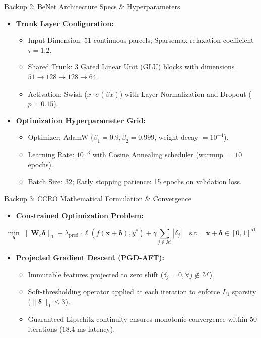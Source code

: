 \documentclass{beamer}
\begin{document}
\begin{frame}{Backup 2: BeNet Architecture Specs \& Hyperparameters}
  \begin{itemize}\setlength{\itemsep}{6pt}\small
    \item \textbf{Trunk Layer Configuration:}
    \begin{itemize}\setlength{\itemsep}{2pt}\footnotesize
      \item Input Dimension: 51 continuous parcels; Sparsemax relaxation coefficient $\tau = 1.2$.
      \item Shared Trunk: 3 Gated Linear Unit (GLU) blocks with dimensions $51 \to 128 \to 128 \to 64$.
      \item Activation: Swish ($x \cdot \sigma(\beta x)$) with Layer Normalization and Dropout ($p = 0.15$).
    \end{itemize}
    \item \textbf{Optimization Hyperparameter Grid:}
    \begin{itemize}\setlength{\itemsep}{2pt}\footnotesize
      \item Optimizer: AdamW ($\beta_1 = 0.9, \beta_2 = 0.999$, weight decay $= 10^{-4}$).
      \item Learning Rate: $10^{-3}$ with Cosine Annealing scheduler (warmup $= 10$ epochs).
      \item Batch Size: 32; Early stopping patience: 15 epochs on validation loss.
    \end{itemize}
  \end{itemize}
\end{frame}

\begin{frame}{Backup 3: CCRO Mathematical Formulation \& Convergence}
  \begin{itemize}\setlength{\itemsep}{6pt}\small
    \item \textbf{Constrained Optimization Problem:}
  \end{itemize}
  \vspace{-0.1cm}
  \begin{equation*}
    \min_{\boldsymbol{\delta}} \; \|\mathbf{W}_c \boldsymbol{\delta}\|_1 + \lambda_{\text{pred}} \cdot \ell(f(\mathbf{x} + \boldsymbol{\delta}), y^*) + \gamma \sum_{j \notin \mathcal{M}} |\delta_j| \quad \text{s.t.} \quad \mathbf{x} + \boldsymbol{\delta} \in [0, 1]^{51}
  \end{equation*}
  \begin{itemize}\setlength{\itemsep}{6pt}\small
    \item \textbf{Projected Gradient Descent (PGD-AFT):}
    \begin{itemize}\setlength{\itemsep}{2pt}\footnotesize
      \item Immutable features projected to zero shift ($\delta_j = 0, \forall j \notin \mathcal{M}$).
      \item Soft-thresholding operator applied at each iteration to enforce $L_1$ sparsity ($\|\boldsymbol{\delta}\|_0 \le 3$).
      \item Guaranteed Lipschitz continuity ensures monotonic convergence within 50 iterations ($18.4$ ms latency).
    \end{itemize}
  \end{itemize}
\end{frame}
\end{document}
